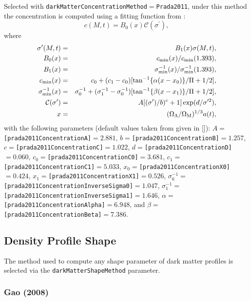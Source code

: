 Selected with {\tt darkMatterConcentrationMethod}$=${\tt Prada2011}, under this method the concentration is computed using a fitting function from \cite{prada_halo_2011}:
\begin{equation}
c(M,t) = B_0(x) \mathcal{C}(\sigma^\prime),
\end{equation}
where
\begin{eqnarray}
\sigma^\prime(M,t) &=& B_1(x) \sigma(M,t), \\
B_0(x) &=& c_{\rm min}(x)/c_{\rm min}(1.393), \\
B_1(x) &=& \sigma^{-1}_{\rm min}(x)/\sigma^{-1}_{\rm min}(1.393), \\
c_{\rm min}(x) &=& c_0 + (c_1-c_0) [\tan^{-1}\{\alpha (x-x_0)\}/\Pi+1/2], \\
\sigma^{-1}_{\rm min}(x) &=& \sigma^{-1}_0 + (\sigma^{-1}_1-\sigma^{-1}_0) [\tan^{-1}\{\beta(x-x_1)\}/\Pi+1/2], \\
\mathcal{C}(\sigma^\prime) &=& A [(\sigma^\prime)/b)^c+1] \exp(d/\sigma^{\prime 2}), \\
x &=& (\Omega_\Lambda/\Omega_{\rm M})^{1/3} a(t),
\end{eqnarray}
with the following parameters (default values taken from \cite{prada_halo_2011} given in []): $A=${\tt [prada2011ConcentrationA]}$=2.881$, $b=${\tt [prada2011ConcentrationB]}$=1.257$, $c=${\tt [prada2011ConcentrationC]}$=1.022$, $d=${\tt [prada2011ConcentrationD]}$=0.060$, $c_0=${\tt [prada2011ConcentrationC0]}$=3.681$, $c_1=${\tt [prada2011ConcentrationC1]}$=5.033$, $x_0=${\tt [prada2011ConcentrationX0]}$=0.424$, $x_1=${\tt [prada2011ConcentrationX1]}$=0.526$, $\sigma^{-1}_0=${\tt [prada2011ConcentrationInverseSigma0]}$=1.047$, $\sigma^{-1}_1=${\tt [prada2011ConcentrationInverseSigma1]}$=1.646$, $\alpha=${\tt [prada2011ConcentrationAlpha]}$=6.948$, and $\beta=${\tt [prada2011ConcentrationBeta]}$=7.386$.

\subsection{Density Profile Shape}\label{sec:DarkMatterProfileShape}

The method used to compute any shape parameter of dark matter profiles is selected via the {\tt darkMatterShapeMethod} parameter.

\subsubsection{Gao (2008)}

